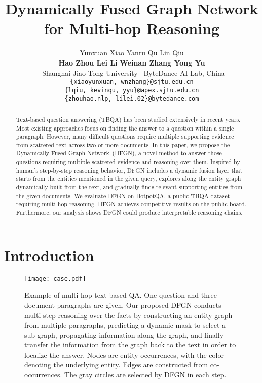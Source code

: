 \documentclass[11pt,a4paper]{article}
\title{Dynamically Fused Graph Network for Multi-hop Reasoning}
\author{
  Yunxuan Xiao \quad Yanru Qu \quad Lin Qiu \\
  \textbf{Hao Zhou \quad Lei Li} \quad
  \textbf{Weinan Zhang \quad Yong Yu} \\
  {~Shanghai Jiao Tong University  \quad ~ByteDance AI Lab, China}\\
  {\tt \{xiaoyunxuan, wnzhang\}@sjtu.edu.cn}\\
  {\tt \{lqiu, kevinqu, yyu\}@apex.sjtu.edu.cn}\\
  {\tt \{zhouhao.nlp, lilei.02\}@bytedance.com} \\
}
\date{}
\newcommand{\hotpotqa}{HotpotQA\xspace}
\newcommand{\method}{DFGN\xspace}
\begin{document}
\maketitle
\renewcommand{\thefootnote}{\fnsymbol{footnote}}
\renewcommand{\thefootnote}{\arabic{footnote}}
\begin{abstract}
Text-based question answering (TBQA) has been studied extensively in recent years.
Most existing approaches focus on finding the answer to a question within a single paragraph. 
However, many difficult questions require multiple supporting evidence from scattered text across two or more documents. 
In this paper, we propose the Dynamically Fused Graph Network~(\method), 
a novel method to answer those questions requiring multiple scattered evidence and reasoning over them. 
Inspired by human's step-by-step reasoning behavior, 
\method includes a dynamic fusion layer
that starts from the entities mentioned in the given query, 
explores along the entity graph dynamically built from the text, 
and gradually finds relevant supporting entities from the given documents. 
We evaluate \method on \hotpotqa, a public TBQA dataset requiring multi-hop reasoning. 
\method achieves competitive results on the public board. 
Furthermore, our analysis shows \method could produce interpretable reasoning chains.  \end{abstract}

\section{Introduction}
\label{sec:intro}
\begin{figure}[t]
\begin{center}
\texttt{[image: case.pdf]}
\end{center}
\caption{Example of multi-hop text-based QA. One question and three document paragraphs are given. 
Our proposed \method conducts multi-step reasoning over the facts by constructing an entity graph from multiple paragraphs,  
predicting a dynamic mask to select a sub-graph, propagating information along the graph, and finally transfer the information from the graph back to the text in order to localize the answer. 
Nodes are entity occurrences, with the color denoting the underlying entity. Edges are constructed from co-occurrences. 
The gray circles are selected by \method in each step.
}
\label{fig:case}
\end{figure}
\end{document}
